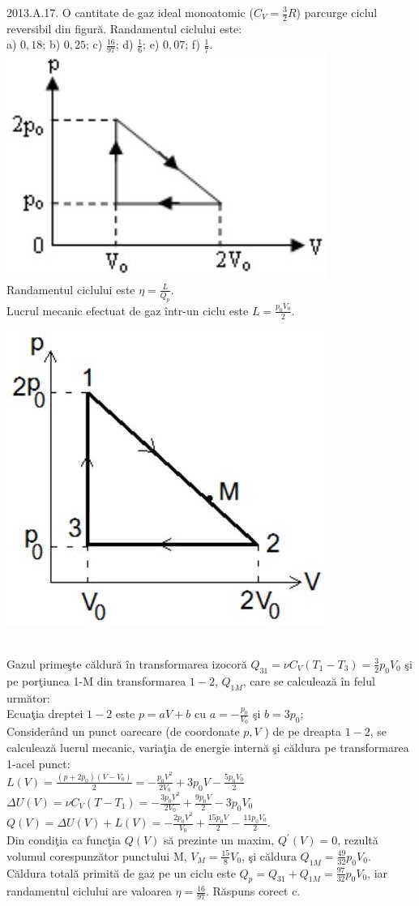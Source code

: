 2013.A.17. O cantitate de gaz ideal monoatomic ($C_{V}=\frac{3}{2} R$) parcurge ciclul reversibil din figură. Randamentul ciclului este:\\ a) $0,18$; b) $0,25$; c) $\frac{16}{97}$; d) $\frac{1}{6}$; e) $0,07$; f) $\frac{1}{7}$.\\ \includegraphics[width=0.4\linewidth]{images/2025_08_19_9e83650bd9c853eca85eg-10}\\ Randamentul ciclului este $\eta=\frac{L}{Q_{p}}$.\\ Lucrul mecanic efectuat de gaz într-un ciclu este $L=\frac{p_{0} V_{0}}{2}$.\\ \begin{center} \includegraphics[width=0.4\linewidth]{images/2025_08_19_9e83650bd9c853eca85eg-10(1)} \end{center}\\ Gazul primeşte căldură în transformarea izocoră $Q_{31}=\nu C_{V}\left(T_{1}-T_{3}\right)=\frac{3}{2} p_{0} V_{0}$ şi pe porţiunea 1-M din transformarea $1-2$, $Q_{1 M}$, care se calculează în felul următor:\\ Ecuaţia dreptei $1-2$ este $p=a V+b$ cu $a=-\frac{p_{0}}{V_{0}}$ şi $b=3 p_{0}$;\\ Considerând un punct oarecare (de coordonate $p, V$ ) de pe dreapta $1-2$, se calculează lucrul mecanic, variaţia de energie internă şi căldura pe transformarea 1-acel punct:\\ $L(V)=\frac{\left(p+2 p_{0}\right)\left(V-V_{0}\right)}{2}=-\frac{p_{0} V^{2}}{2 V_{0}}+3 p_{0} V-\frac{5 p_{0} V_{0}}{2}$\\ $\Delta U(V)=\nu C_{V}\left(T-T_{1}\right)=-\frac{3 p_{0} V^{2}}{2 V_{0}}+\frac{9 p_{0} V}{2}-3 p_{0} V_{0}$\\ $Q(V)=\Delta U(V)+L(V)=-\frac{2 p_{0} V^{2}}{V_{0}}+\frac{15 p_{0} V}{2}-\frac{11 p_{0} V_{0}}{2}$.\\ Din condiţia ca funcţia $Q(V)$ să prezinte un maxim, $Q^{\prime}(V)=0$, rezultă volumul corespunzător punctului $\mathrm{M}$, $V_{M}=\frac{15}{8} V_{0}$, şi căldura $Q_{1 M}=\frac{49}{32} p_{0} V_{0}$.\\ Căldura totală primită de gaz pe un ciclu este $Q_{p}=Q_{31}+Q_{1 M}=\frac{97}{32} p_{0} V_{0}$, iar randamentul ciclului are valoarea $\eta=\frac{16}{97}$. Răspuns corect c.\\

